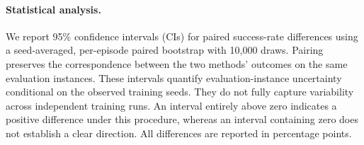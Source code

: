 \paragraph{Statistical analysis.} We report 95\% confidence intervals (CIs) for paired success-rate differences using a seed-averaged, per-episode paired bootstrap with 10,000 draws. Pairing preserves the correspondence between the two methods' outcomes on the same evaluation instances. These intervals quantify evaluation-instance uncertainty conditional on the observed training seeds. They do not fully capture variability across independent training runs.
An interval entirely above zero indicates a positive difference under this procedure, whereas an interval containing zero does not establish a clear direction. All differences are reported in percentage points.